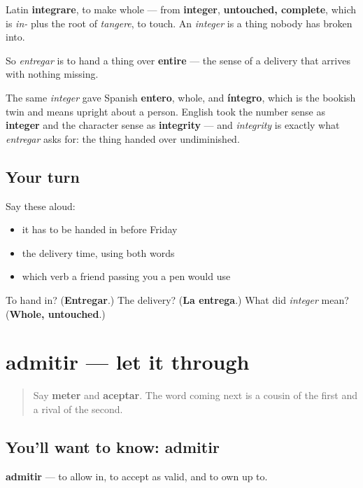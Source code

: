 \begin{cousinweb}
Latin \textbf{integrare}, to make whole — from \textbf{integer}, \textbf{untouched, complete}, which is \emph{in-} plus the root of \emph{tangere}, to touch. An \emph{integer} is a thing nobody has broken into.

So \emph{entregar} is to hand a thing over \textbf{entire} — the sense of a delivery that arrives with nothing missing.

The same \emph{integer} gave Spanish \textbf{entero}, whole, and \textbf{íntegro}, which is the bookish twin and means upright about a person. English took the number sense as \textbf{integer} and the character sense as \textbf{integrity} — and \emph{integrity} is exactly what \emph{entregar} asks for: the thing handed over undiminished.
\end{cousinweb}

\subsection*{Your turn}
Say these aloud:

\begin{itemize}
\raggedright
  \item it has to be handed in before Friday
  \item the delivery time, using both words
  \item which verb a friend passing you a pen would use
\end{itemize}

\begin{tcolorbox}[breakable,colback=teal!4,colframe=teal!35!black,title={Before you move on}]
To hand in? (\textbf{Entregar}.) The delivery? (\textbf{La entrega}.) What did \emph{integer} mean? (\textbf{Whole, untouched}.)
\end{tcolorbox}
\section[admitir]{admitir — let it through}

\label{lesson:ES-C458-admitir}



\begin{quote}
Say \textbf{meter} and \textbf{aceptar}. The word coming next is a cousin of the first and a rival of the second.
\end{quote}

\subsection*{You'll want to know: admitir}
\textbf{admitir} — to allow in, to accept as valid, and to own up to.

